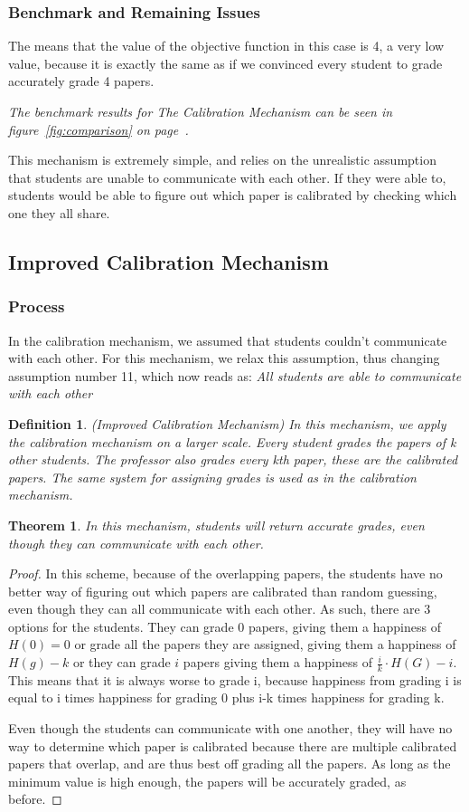 \documentclass[12pt, Arial]{article}
\newtheorem{theorem}{Theorem}
\newtheorem{definition}{Definition}
\begin{document}
\subsubsection{Benchmark and Remaining Issues}
The means that the value of the objective function in this case is 4, a very low value, because it is exactly the same as if we convinced every student to grade accurately grade 4 papers.

\emph{The benchmark results for The Calibration Mechanism can be seen in figure~\ref{fig:comparison} on page~\pageref{fig:comparison}.}

This mechanism is extremely simple, and relies on the unrealistic assumption that students are unable to communicate with each other. If they were able to, students would be able to figure out which paper is calibrated by checking which one they all share.

\subsection{Improved Calibration Mechanism}
\subsubsection{Process}
In the calibration mechanism, we assumed that students couldn't communicate with each other. For this mechanism, we relax this assumption, thus changing assumption number 11, which now reads as: \emph{All students are able to communicate with each other}
\begin{definition}(Improved Calibration Mechanism)
In this mechanism, we apply the calibration mechanism on a larger scale. Every student grades the papers of \emph{k} other students. The professor also grades every \emph{kth} paper, these are the calibrated papers. The same system for assigning grades is used as in the calibration mechanism.
\end{definition}
\begin{theorem}
In this mechanism, students will return accurate grades, even though they can communicate with each other.
\end{theorem}
\begin{proof}
In this scheme, because of the overlapping papers, the students have no better way of figuring out which papers are calibrated than random guessing, even though they can all communicate with each other. As such, there are 3 options for the students. They can grade 0 papers, giving them a happiness of $H(0) = 0$ or grade all the papers they are assigned, giving them a happiness of $H(g) - k$ or they can grade $i$ papers giving them a happiness of $\frac{i}{k} \cdot H(G)-i$. This means that it is always worse to grade i, because happiness from grading i is equal to i times happiness for grading 0 plus i-k times happiness for grading k.

Even though the students can communicate with one another, they will have no way to determine which paper is calibrated because there are multiple calibrated papers that overlap, and are thus best off grading all the papers. As long as the minimum value is high enough, the papers will be accurately graded, as before.
\end{proof}
\end{document}
